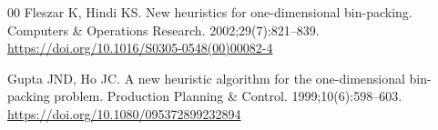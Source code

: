 \documentclass[12pt]{article}
\begin{document}
\begin{thebibliography}{00}
 Fleszar K, Hindi KS. New heuristics for one-dimensional bin-packing. Computers \& Operations Research. 2002;29(7):821--839. \url{https://doi.org/10.1016/S0305-0548(00)00082-4}

 Gupta JND, Ho JC. A new heuristic algorithm for the one-dimensional bin-packing problem. Production Planning \& Control. 1999;10(6):598--603. \url{https://doi.org/10.1080/095372899232894}




\end{thebibliography}
\end{document}
